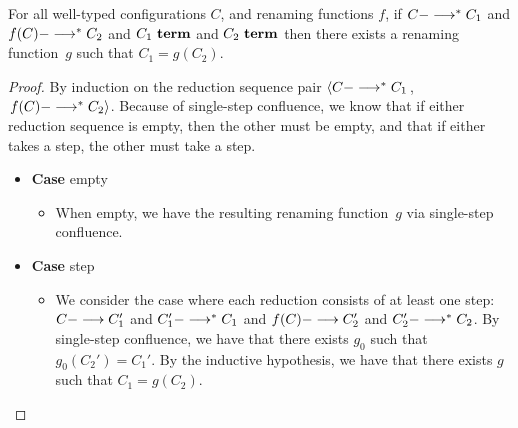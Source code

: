 \begin{theorem}
For all well-typed configurations $C$,
and renaming functions $f$,
%
 if $C --->^\ast C_1$ 
and $f(C) --->^\ast C_2$ 
and $C_1~\textbf{term}$
and $C_2~\textbf{term}$
then 
there exists a renaming function~$g$ 
such that $C_1 = g(C_2)$.
\begin{proof}
  By induction on the reduction sequence pair
  $\left< C --->^\ast C_1\right.$, 
  $\left.f(C) --->^\ast C_2 \right>$.
  Because of single-step confluence, we know that
  if either reduction sequence is empty, then the other must be empty,
  and that
  if either takes a step, the other must take a step.

   \begin{itemize}[leftmargin=*]
   \item[] \textbf{Case} empty
     \begin{itemize}[leftmargin=*]
       \item[] When empty, we have the resulting renaming function~$g$ via
         single-step confluence.
     \end{itemize}

   \item[] \textbf{Case} step
     \begin{itemize}[leftmargin=*]
       \item[] We consider the case where each reduction consists of at least
         one step: $C ---> C_1'$ and $C_1' --->^\ast C_1$ and
         $f(C) ---> C_2'$ and $C_2' --->^\ast C_2$.  By single-step
         confluence, we have that there exists $g_0$ such that $g_0(C_2') =
         C_1'$.  By the inductive hypothesis, we have that there exists $g$ such
         that $C_1 = g(C_2)$.
     \end{itemize}     
   \end{itemize}
\end{proof}
\end{theorem}
